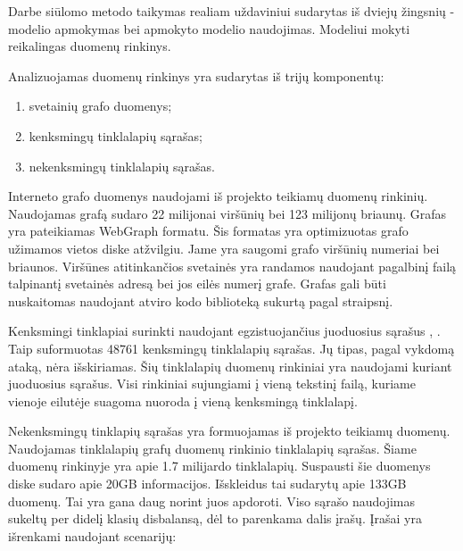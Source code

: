 Darbe siūlomo metodo taikymas realiam uždaviniui sudarytas iš dviejų žingsnių - modelio apmokymas
bei apmokyto modelio naudojimas. Modeliui mokyti reikalingas duomenų rinkinys.


Analizuojamas duomenų rinkinys yra sudarytas iš trijų komponentų:
\begin{enumerate}
    \item svetainių grafo duomenys;
    \item kenksmingų tinklalapių sąrašas;
    \item nekenksmingų tinklalapių sąrašas.
\end{enumerate}

Interneto grafo duomenys naudojami iš \cite{webgraph} projekto teikiamų duomenų rinkinių. Naudojamas grafą sudaro 22
milijonai viršūnių bei 123 milijonų briaunų. Grafas yra pateikiamas WebGraph formatu. Šis formatas yra optimizuotas
grafo užimamos vietos diske atžvilgiu. Jame yra saugomi grafo viršūnių numeriai bei briaunos. Viršūnes atitinkančios
svetainės yra randamos naudojant pagalbinį failą talpinantį svetainės adresą bei jos eilės numerį grafe. Grafas
gali būti nuskaitomas naudojant atviro kodo biblioteką sukurtą pagal \cite{boldi2004webgraph} straipsnį.

Kenksmingi tinklapiai surinkti naudojant egzistuojančius juoduosius sąrašus \cite{mal1}, \cite{mal2} \cite{mal3}
\cite{mal4}. Taip suformuotas 48761 kenksmingų tinklalapių sąrašas. Jų tipas, pagal vykdomą ataką, nėra išskiriamas.
Šių tinklalapių duomenų rinkiniai yra naudojami kuriant juoduosius sąrašus. Visi rinkiniai sujungiami į vieną tekstinį
failą, kuriame vienoje eilutėje suagoma nuoroda į vieną kenksmingą tinklalapį.


Nekenksmingų tinklapių sąrašas yra formuojamas iš \cite{webgraph} projekto teikiamų duomenų. Naudojamas tinklalapių
grafų duomenų rinkinio tinklalapių sąrašas. Šiame duomenų rinkinyje yra apie 1.7 milijardo tinklalapių. Suspausti
šie duomenys diske sudaro apie 20GB informacijos. Išskleidus tai sudarytų apie 133GB duomenų. Tai yra gana daug
norint juos apdoroti. Viso sąrašo naudojimas sukeltų per didelį klasių disbalansą, dėl to parenkama dalis įrašų.
Įrašai yra išrenkami naudojant scenarijų:

